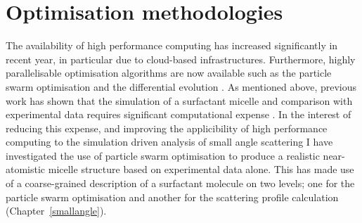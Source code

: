\section{Optimisation methodologies}

The availability of high performance computing has increased significantly in recent year, in particular due to cloud-based infrastructures.
Furthermore, highly parallelisable optimisation algorithms are now available such as the particle swarm optimisation \cite{kennedy_particle_1995,shi_modified_1998} and the differential evolution \cite{storn_differential_1997}.
As mentioned above, previous work has shown that the simulation of a surfactant micelle and comparison with experimental data requires significant computational expense \cite{hargreaves_atomistic_2011,ivanovic_temperature-dependent_2018}.
In the interest of reducing this expense, and improving the applicibility of high performance computing to the simulation driven analysis of small angle scattering I have investigated the use of particle swarm optimisation to produce a realistic near-atomistic micelle structure based on experimental data alone.
This has made use of a coarse-grained description of a surfactant molecule on two levels; one for the particle swarm optimisation and another for the scattering profile calculation (Chapter~\ref{smallangle}).
